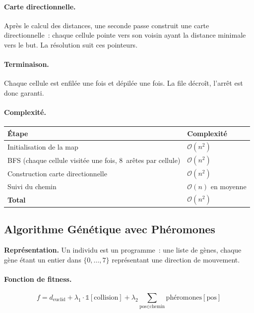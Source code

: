\documentclass[12pt, a4paper]{article}
\theoremstyle{definition}
\theoremstyle{remark}
\newcommand{\bigO}[1]{\mathcal{O}\!\left(#1\right)}
\begin{document}
\paragraph{Carte directionnelle.}
Après le calcul des distances, une seconde passe construit une carte directionnelle~:
chaque cellule pointe vers son voisin ayant la distance minimale vers le but. La
résolution suit ces pointeurs.

\paragraph{Terminaison.}
Chaque cellule est enfilée une fois et dépilée une fois. La file décroît, l'arrêt
est donc garanti.

\paragraph{Complexité.}

\begin{center}
\begin{tabular}{ll}
    \toprule
    Étape & Complexité \\
    \midrule
    Initialisation de la map & $\bigO{n^2}$ \\
    BFS (chaque cellule visitée une fois, 8~arêtes par cellule) & $\bigO{n^2}$ \\
    Construction carte directionnelle & $\bigO{n^2}$ \\
    Suivi du chemin & $\bigO{n}$ en moyenne \\
    \midrule
    \textbf{Total} & $\bigO{n^2}$ \\
    \bottomrule
\end{tabular}
\end{center}

\subsection{Algorithme Génétique avec Phéromones}

\textbf{Représentation.}
Un individu est un programme~: une liste de gènes, chaque gène étant un entier
dans $\{0, \ldots, 7\}$ représentant une direction de mouvement.

\paragraph{Fonction de fitness.}
\begin{equation}
    f = d_{\text{euclid}} + \lambda_1 \cdot \mathbb{1}[\text{collision}]
        + \lambda_2 \sum_{\text{pos} \in \text{chemin}} \text{phéromones}[\text{pos}]
\end{equation}
\end{document}
